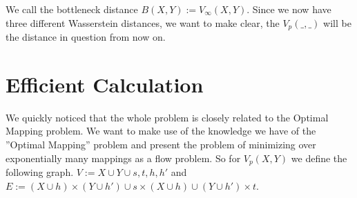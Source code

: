 \documentclass[11pt, a4paper,draft]{report}
\begin{document}
We call the bottleneck distance $B(X,Y) := V_\infty(X,Y)$. Since we now have three different Wasserstein distances, we want to make clear, the $V_p(\_,\_)$ will be the distance in question from now on. 
 	
 	\section{Efficient Calculation}
 	
We quickly noticed that the whole problem is closely related to the Optimal Mapping problem. We want to make use of the knowledge we have of the ''Optimal Mapping'' problem and present the problem of minimizing over exponentially many mappings as a flow problem. So for $V_p(X,Y)$ we define the following graph. $V := X\cup Y\cup {s,t,h,h'}$ and $E := (X\cup h)\times (Y\cup h') \cup {s}\times (X\cup h) \cup (Y\cup h')\times t$.\\\
\end{document}
